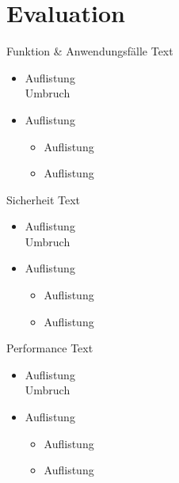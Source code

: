 \documentclass{sdqbeamer}
\begin{document}
\section{Evaluation}

\begin{frame}{Funktion \& Anwendungsfälle}
	Text
	\begin{itemize}
		\item Auflistung\\ Umbruch
		\item Auflistung
		\begin{itemize}
			\item Auflistung
			\item Auflistung
		\end{itemize}
	\end{itemize}
\end{frame}

\begin{frame}{Sicherheit}
	Text
	\begin{itemize}
		\item Auflistung\\ Umbruch
		\item Auflistung
		\begin{itemize}
			\item Auflistung
			\item Auflistung
		\end{itemize}
	\end{itemize}
\end{frame}

\begin{frame}{Performance}
	Text
	\begin{itemize}
		\item Auflistung\\ Umbruch
		\item Auflistung
		\begin{itemize}
			\item Auflistung
			\item Auflistung
		\end{itemize}
	\end{itemize}
\end{frame}
\end{document}
